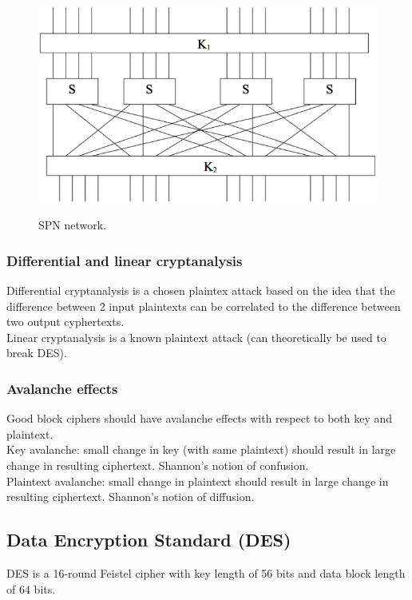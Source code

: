 \documentclass{article}
\begin{document}
\begin{figure}[H]
\centering
\includegraphics[scale=0.55]{Images/spnnetwork.png}
\label{fig:spnnetwoek}
\caption{SPN network.}
\end{figure}

\subsubsection{Differential and linear cryptanalysis}

Differential cryptanalysis is a chosen plaintex attack based on the idea that the difference between 2 input plaintexts can be correlated to the difference between two output cyphertexts.\\
Linear cryptanalysis is a known plaintext attack (can theoretically be used to break DES).

\subsubsection{Avalanche effects}

Good block ciphers should have avalanche effects with respect to both key and plaintext.\\
Key avalanche: small change in key (with same plaintext) should result in large change in resulting ciphertext. Shannon's notion of confusion.\\
Plaintext avalanche: small change in plaintext should result in large change in resulting ciphertext. Shannon's notion of diffusion.

\subsection{Data Encryption Standard (DES)}

DES is a 16-round Feistel cipher with key length of 56 bits and data block length of 64 bits.
\end{document}
